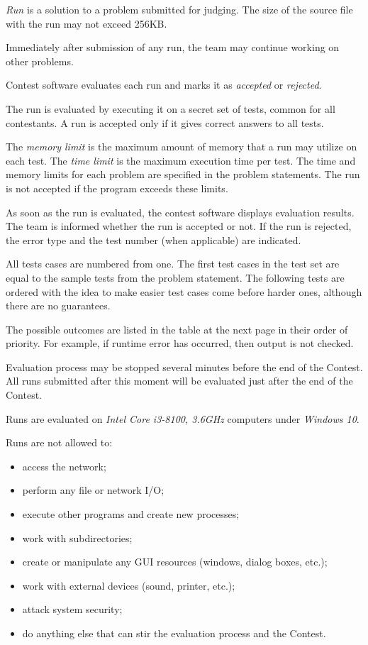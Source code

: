 
\emph{Run} is a solution to a problem submitted for judging.
The size of the source file with the run may not exceed 256KB.

Immediately after submission of any run, the team may continue working on
other problems.

Contest software evaluates each run and marks it as \emph{accepted} or \emph{rejected}.

The run is evaluated by executing it on a secret set of tests, common for
all contestants.
A run is accepted only if it gives correct answers to all tests.

The \emph{memory limit} is the maximum amount of memory that a run may
utilize on each test.
The \emph{time limit} is the maximum execution time per test.
The time and memory limits for each problem are specified in the problem statements.
The run is not accepted if the program exceeds these limits.

As soon as the run is evaluated, the contest software displays evaluation results.
The team is informed whether the run is accepted or not.
If the run is rejected, the error type and the test number (when applicable)
are indicated.

All tests cases are numbered from one. The first test cases in the test set
are equal to the sample tests from the problem statement.
The following tests are ordered with the idea to make easier test cases
come before harder ones, although there are no guarantees.

The possible outcomes are listed in the table at the next page in their order of priority.
For example, if runtime error has occurred, then output is not checked.

Evaluation process may be stopped several minutes before the end of the
Contest.
All runs submitted after this moment will be evaluated just after the end
of the Contest.

Runs are evaluated on \emph{Intel Core i3-8100, 3.6GHz} computers under
\emph{Windows 10}.

Runs are not allowed to:
\begin{itemize}
    \item access the network;
    \item perform any file or network I/O;
    \item execute other programs and create new processes;
    \item work with subdirectories;
    \item create or manipulate any GUI resources (windows, dialog boxes, etc.);
    \item work with external devices (sound, printer, etc.);
    \item attack system security;
    \item do anything else that can stir the evaluation process and the Contest.
\end{itemize}


